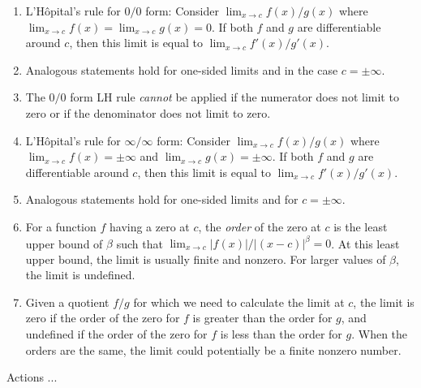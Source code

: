 \documentclass[10pt]{amsart}
\begin{document}
\begin{enumerate}
\item L'H\^{o}pital's rule for $0/0$ form: Consider $\lim_{x \to c}
  f(x)/g(x)$ where $\lim_{x \to c} f(x) = \lim_{x \to c} g(x) = 0$. If
  both $f$ and $g$ are differentiable around $c$, then this limit is
  equal to $\lim_{x \to c} f'(x)/g'(x)$.
\item Analogous statements hold for one-sided limits and in the case
  $c = \pm \infty$.
\item The $0/0$ form LH rule {\em cannot} be applied if the numerator
  does not limit to zero or if the denominator does not limit to zero.
\item L'H\^{o}pital's rule for $\infty/\infty$ form: Consider $\lim_{x
  \to c} f(x)/g(x)$ where $\lim_{x \to c} f(x) = \pm \infty$ and
  $\lim_{x \to c} g(x) = \pm \infty$. If both $f$ and $g$ are
  differentiable around $c$, then this limit is equal to $\lim_{x \to
  c} f'(x)/g'(x)$.
\item Analogous statements hold for one-sided limits and for $c = \pm
  \infty$.
\item For a function $f$ having a zero at $c$, the {\em order} of the
  zero at $c$ is the least upper bound of $\beta$ such that $\lim_{x
  \to c} |f(x)|/|(x - c)|^{\beta} = 0$. At this least upper bound, the
  limit is usually finite and nonzero. For larger values of $\beta$,
  the limit is undefined.
\item Given a quotient $f/g$ for which we need to calculate the limit
  at $c$, the limit is zero if the order of the zero for $f$ is
  greater than the order for $g$, and undefined if the order of the
  zero for $f$ is less than the order for $g$. When the orders are the
  same, the limit could potentially be a finite nonzero number.
\end{enumerate}

Actions ...
\end{document}
